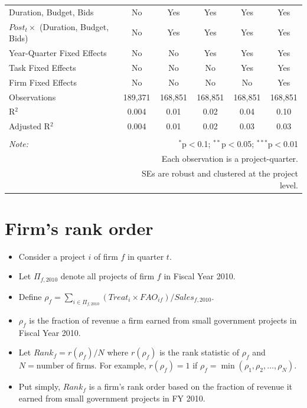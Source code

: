 \documentclass[
]{article}
\providecommand{\tightlist}{%
  \setlength{\itemsep}{0pt}\setlength{\parskip}{0pt}}
\begin{document}
\begin{table}[H]
\begin{tabular}{@{\extracolsep{-2pt}}lccccc}
Duration, Budget, Bids & No & Yes & Yes & Yes & Yes \\ 
$Post_t \times $  (Duration, Budget, Bids) & No & Yes & Yes & Yes & Yes \\ 
Year-Quarter Fixed Effects & No & No & Yes & Yes & Yes \\ 
Task Fixed Effects & No & No & No & Yes & Yes \\ 
Firm Fixed Effects & No & No & No & No & Yes \\ 
Observations & 189,371 & 168,851 & 168,851 & 168,851 & 168,851 \\ 
R$^{2}$ & 0.004 & 0.01 & 0.02 & 0.04 & 0.10 \\ 
Adjusted R$^{2}$ & 0.004 & 0.01 & 0.02 & 0.03 & 0.03 \\ 
\hline 
\hline \\[-1.8ex] 
\textit{Note:}  & \multicolumn{5}{r}{$^{*}$p$<$0.1; $^{**}$p$<$0.05; $^{***}$p$<$0.01} \\ 
 & \multicolumn{5}{r}{Each observation is a project-quarter.} \\ 
 & \multicolumn{5}{r}{SEs are robust and clustered at the project level.} \\ 
\end{tabular} 
\end{table}

\hypertarget{firms-rank-order}{%
\section{Firm's rank order}\label{firms-rank-order}}

\begin{itemize}
\tightlist
\item
  Consider a project \(i\) of firm \(f\) in quarter \(t\).
\item
  Let \(\Pi_{f,2010}\) denote all projects of firm \(f\) in Fiscal Year
  2010.
\item
  Define
  \(\rho_f = \sum_{i \in \Pi_{f,2010}} (Treat_i \times FAO_{if})/Sales_{f,\text{2010}}\).
\item
  \(\rho_f\) is the fraction of revenue a firm earned from small
  government projects in Fiscal Year 2010.
\item
  Let \(Rank_f = r(\rho_f)/N\) where \(r(\rho_f)\) is the rank statistic
  of \(\rho_{f}\) and \(N = \text{number of firms}.\) For example,
  \(r(\rho_f)=1\) if \(\rho_f=\min(\rho_1,\rho_2,\ldots,\rho_N)\).
\item
  Put simply, \(Rank_f\) is a firm's rank order based on the fraction of
  revenue it earned from small government projects in FY 2010.
\end{itemize}
\end{document}
